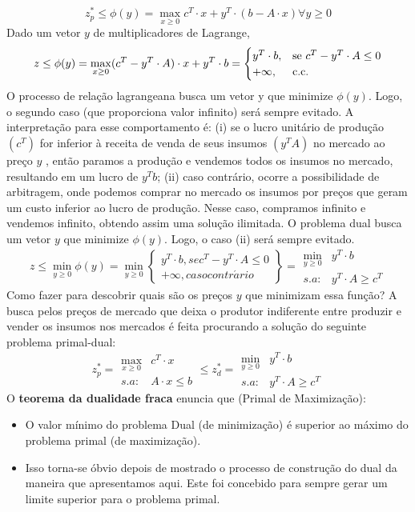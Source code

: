 \[
z_{p}^{*}\leq\phi(y)=\max_{x\geq0}c^{T}\cdot x+y^{T}\cdot(b-A\cdot x)\forall y\geq0
\]
 Dado um vetor $y$ de multiplicadores de Lagrange,
\[
z\leq\phi(y)=\max_{x\geq0}(c^{T}-y^{T}\cdot A)\cdot x+y^{T}\cdot b=
\begin{cases}
y^{T}\cdot b, & \mbox{se \ensuremath{c^{T}-y^{T}\cdot A\leq0}}\\
+\infty, & \mbox{c.c.}
\end{cases}
\]
 O processo de relação lagrangeana busca um vetor y que minimize $\phi(y)$. Logo, o segundo caso (que proporciona valor infinito) será sempre evitado. A interpretação para esse comportamento é:
(i) se o lucro unitário de produção $(c^{T})$ for inferior à receita de venda de seus insumos $(y^{T}A)$ no mercado ao preço $y$ , então paramos a produção e vendemos todos os insumos no mercado, resultando em um lucro de $y^{T}b$;
(ii) caso contrário, ocorre a possibilidade de arbitragem, onde podemos comprar no mercado os insumos por preços que geram um custo inferior ao lucro de produção. Nesse caso, compramos infinito e vendemos infinito, obtendo assim uma solução ilimitada.
O problema dual busca um vetor $y$ que minimize $\phi(y)$. Logo, o caso (ii) será sempre evitado.
\[
z\leq\min_{y\geq0}\phi(y)=\min_{y\geq0}
\left\{ \begin{array}{c}
y^{T}\cdot b,sec^{T}-y^{T}\cdot A\leq0\\
+\infty,casocontr\acute{a}rio
\end{array}\right\} =\begin{array}{cc}
\min_{y\geq0} & y^{T}\cdot b\\
s.a: & y^{T}\cdot A\geq c^{T}
\end{array}
\]
Como fazer para descobrir quais são os preços $y$ que minimizam essa função? A busca pelos preços de mercado que deixa o produtor indiferente entre produzir e vender os insumos nos mercados é feita procurando a solução do seguinte problema primal-dual:
\[
z_{p}^{*}=\begin{array}{cc}
\max_{x\geq0} & c^{T}\cdot x\\
s.a: & A\cdot x\leq b
\end{array}\leq z_{d}^{*}=\begin{array}{cc}
\min_{y\geq0} & y^{T}\cdot b\\
s.a: & y^{T}\cdot A\geq c^{T}
\end{array}
\]
 O \textbf{teorema da dualidade fraca} enuncia que (Primal de Maximização):
 \begin{itemize}
 \item O valor mínimo do problema Dual (de minimização) é superior ao máximo do problema primal (de maximização).
 \item Isso torna-se óbvio depois de mostrado o processo de construção do
 dual da maneira que apresentamos aqui. Este foi concebido para sempre
 gerar um limite superior para o problema primal.
 \end{itemize}
